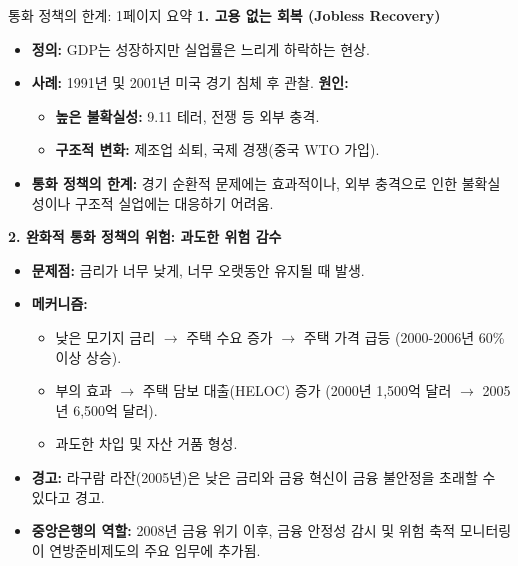 \documentclass[11pt,a4paper]{article}
\theoremstyle{definition}
\begin{document}
\begin{summarybox}{통화 정책의 한계: 1페이지 요약}
\textbf{1. 고용 없는 회복 (Jobless Recovery)}
\begin{itemize}
    \item \textbf{정의:} GDP는 성장하지만 실업률은 느리게 하락하는 현상.
    \item \textbf{사례:} 1991년 및 2001년 미국 경기 침체 후 관찰.
    \textbf{원인:}
    \begin{itemize}
        \item \textbf{높은 불확실성:} 9.11 테러, 전쟁 등 외부 충격.
        \item \textbf{구조적 변화:} 제조업 쇠퇴, 국제 경쟁(중국 WTO 가입).
    \end{itemize}
    \item \textbf{통화 정책의 한계:} 경기 순환적 문제에는 효과적이나, 외부 충격으로 인한 불확실성이나 구조적 실업에는 대응하기 어려움.
\end{itemize}

\textbf{2. 완화적 통화 정책의 위험: 과도한 위험 감수}
\begin{itemize}
    \item \textbf{문제점:} 금리가 너무 낮게, 너무 오랫동안 유지될 때 발생.
    \item \textbf{메커니즘:}
    \begin{itemize}
        \item 낮은 모기지 금리 $\rightarrow$ 주택 수요 증가 $\rightarrow$ 주택 가격 급등 (2000-2006년 60\% 이상 상승).
        \item 부의 효과 $\rightarrow$ 주택 담보 대출(HELOC) 증가 (2000년 1,500억 달러 $\rightarrow$ 2005년 6,500억 달러).
        \item 과도한 차입 및 자산 거품 형성.
    \end{itemize}
    \item \textbf{경고:} 라구람 라잔(2005년)은 낮은 금리와 금융 혁신이 금융 불안정을 초래할 수 있다고 경고.
    \item \textbf{중앙은행의 역할:} 2008년 금융 위기 이후, 금융 안정성 감시 및 위험 축적 모니터링이 연방준비제도의 주요 임무에 추가됨.
\end{itemize}
\end{summarybox}
\end{document}
